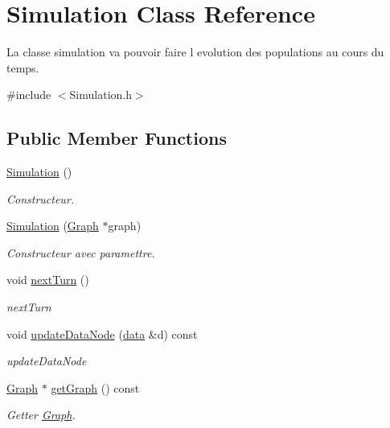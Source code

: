 \hypertarget{class_simulation}{}\section{Simulation Class Reference}
\label{class_simulation}


La classe simulation va pouvoir faire l evolution des populations au cours du temps.  




{\ttfamily \#include $<$Simulation.\+h$>$}

\subsection*{Public Member Functions}
\begin{DoxyCompactItemize}
\item 
\mbox{\hyperlink{class_simulation_a5b224cc5b36bcc8eb29689aff223de41}{Simulation}} ()
\begin{DoxyCompactList}\small\item\em Constructeur. \end{DoxyCompactList}\item 
\mbox{\hyperlink{class_simulation_acac8de557d6db1b0c1ea78b8043b5271}{Simulation}} (\mbox{\hyperlink{class_graph}{Graph}} $\ast$graph)
\begin{DoxyCompactList}\small\item\em Constructeur avec paramettre. \end{DoxyCompactList}\item 
void \mbox{\hyperlink{class_simulation_a37a0a4dc49da67e14a09c650412d0a6e}{next\+Turn}} ()
\begin{DoxyCompactList}\small\item\em next\+Turn \end{DoxyCompactList}\item 
void \mbox{\hyperlink{class_simulation_aef637346a3cf4fc4c5f807f2b5bbae61}{update\+Data\+Node}} (\mbox{\hyperlink{_graph_8h_a98cbe1f79429fc62806b32b6e8871d9e}{data}} \&d) const
\begin{DoxyCompactList}\small\item\em update\+Data\+Node \end{DoxyCompactList}\item 
\mbox{\hyperlink{class_graph}{Graph}} $\ast$ \mbox{\hyperlink{class_simulation_a296949268560dd447dfe3b36d36610b3}{get\+Graph}} () const
\begin{DoxyCompactList}\small\item\em Getter \mbox{\hyperlink{class_graph}{Graph}}. \end{DoxyCompactList}\item 

\end{DoxyCompactItemize}
